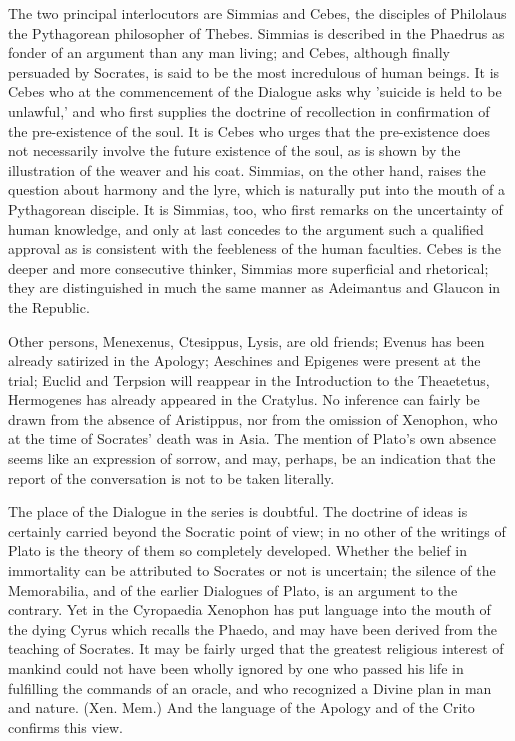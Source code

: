 The two principal interlocutors are Simmias and Cebes, the disciples of
Philolaus the Pythagorean philosopher of Thebes. Simmias is described
in the Phaedrus as fonder of an argument than any man living; and
Cebes, although finally persuaded by Socrates, is said to be the most
incredulous of human beings. It is Cebes who at the commencement of
the Dialogue asks why 'suicide is held to be unlawful,' and who
first supplies the doctrine of recollection in confirmation of the
pre-existence of the soul. It is Cebes who urges that the pre-existence
does not necessarily involve the future existence of the soul, as is
shown by the illustration of the weaver and his coat. Simmias, on the
other hand, raises the question about harmony and the lyre, which is
naturally put into the mouth of a Pythagorean disciple. It is Simmias,
too, who first remarks on the uncertainty of human knowledge, and
only at last concedes to the argument such a qualified approval as is
consistent with the feebleness of the human faculties. Cebes is the
deeper and more consecutive thinker, Simmias more superficial and
rhetorical; they are distinguished in much the same manner as Adeimantus
and Glaucon in the Republic.

Other persons, Menexenus, Ctesippus, Lysis, are old friends; Evenus
has been already satirized in the Apology; Aeschines and Epigenes
were present at the trial; Euclid and Terpsion will reappear in the
Introduction to the Theaetetus, Hermogenes has already appeared in
the Cratylus. No inference can fairly be drawn from the absence of
Aristippus, nor from the omission of Xenophon, who at the time of
Socrates' death was in Asia. The mention of Plato's own absence seems
like an expression of sorrow, and may, perhaps, be an indication that
the report of the conversation is not to be taken literally.

The place of the Dialogue in the series is doubtful. The doctrine of
ideas is certainly carried beyond the Socratic point of view; in no
other of the writings of Plato is the theory of them so completely
developed. Whether the belief in immortality can be attributed to
Socrates or not is uncertain; the silence of the Memorabilia, and of the
earlier Dialogues of Plato, is an argument to the contrary. Yet in the
Cyropaedia Xenophon has put language into the mouth of the dying Cyrus
which recalls the Phaedo, and may have been derived from the teaching of
Socrates. It may be fairly urged that the greatest religious interest of
mankind could not have been wholly ignored by one who passed his life in
fulfilling the commands of an oracle, and who recognized a Divine plan
in man and nature. (Xen. Mem.) And the language of the Apology and of
the Crito confirms this view.

